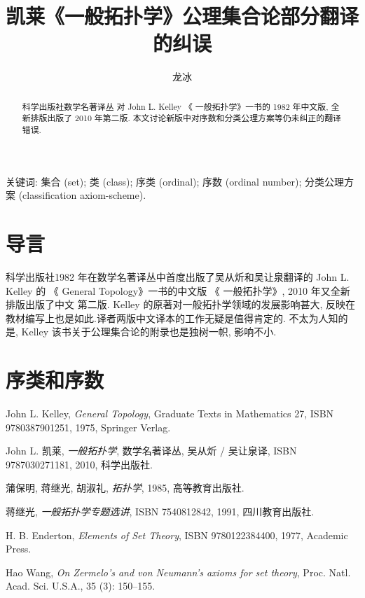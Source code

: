 \documentclass[zihao=-4,a4paper]{ctexart}
\title{凯莱《一般拓扑学》公理集合论部分翻译的纠误}
\author{龙\quad 冰}
\date{}
\begin{document}
\maketitle
\begin{abstract}
科学出版社数学名著译丛 对 John L. Kelley 《 一般拓扑学》一书的 1982 年中文版, 全新排版出版了 2010 年第二版.
本文讨论新版中对序数和分类公理方案等仍未纠正的翻译错误.
\end{abstract}
	
关键词: 集合 (set); 类 (class); 序类 (ordinal); 
	序数 (ordinal number); 
	分类公理方案 (classification axiom-scheme).
	
	
	
\section{导言}
科学出版社1982 年在数学名著译丛中首度出版了吴从炘和吴让泉翻译的  John L. Kelley 的 《 General  Topology》\cite{jkelley1975}一书的中文版 《 一般拓扑学》, 2010 年又全新排版出版了中文 第二版\cite{jkelley2010zh}. Kelley 的原著对一般拓扑学领域的发展影响甚大, 反映在教材编写上也是如此\cite{PuJiangHu1985}.译者两版中文译本的工作无疑是值得肯定的. 不太为人知的是, Kelley 该书关于公理集合论的附录也是独树一帜, 影响不小. 

	
\section{序类和序数 }
	
	

	
\begin{thebibliography}{9}
John L. Kelley,  \emph{General Topology}, Graduate Texts in Mathematics 27, ISBN 9780387901251, 1975, Springer Verlag.
	
John L. 凯莱,  \emph{一般拓扑学}, 数学名著译丛, 吴从炘 / 吴让泉译, ISBN 9787030271181, 2010, 科学出版社.

蒲保明, 蒋继光, 胡淑礼, \emph{拓扑学}, 1985, 高等教育出版社.

蒋继光, \emph{一般拓扑学专题选讲}, ISBN 7540812842, 1991, 四川教育出版社.
	
H. B. Enderton, \emph{Elements of Set Theory}, ISBN 9780122384400, 1977, Academic Press.
	
Hao Wang, \emph{On Zermelo's and von Neumann's axioms for set theory}, Proc. Natl. Acad. Sci. U.S.A., 35 (3): 150–155.
	
\end{thebibliography}
\end{document}
